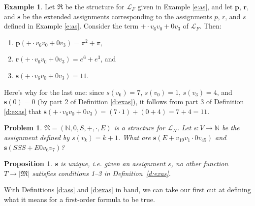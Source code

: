 \documentclass[12pt]{amsbook}
\theoremstyle{plain}
\newtheorem{prop}[thm]{Proposition}
\newtheorem{prob}[thm]{Problem}
\theoremstyle{definition}
\newtheorem{exmp}{Example}[chapter]
\theoremstyle{remark}
\begin{document}
\begin{exmp} \label{e:exas}
Let $\mathfrak{R}$ be the structure for $\mathcal{L}_F$ given in Example \ref{e:as},  and let $\mathbf{p}$,  $\mathbf{r}$,  and $\mathbf{s}$ be the extended assignments corresponding to the assignments $p$,  $r$,  and $s$ defined in Example \ref{e:as}.  Consider the term $+ \cdot v_6 v_0 + 0 v_3$ of $\mathcal{L}_F$.  Then:
\begin{enumerate}
\item $\mathbf{p}(+ \cdot v_6 v_0 + 0 v_3) = \pi^2 + \pi$,
\item $\mathbf{r}(+ \cdot v_6 v_0 + 0 v_3) = e^6 + e^3$,  and
\item $\mathbf{s}(+ \cdot v_6 v_0 + 0 v_3) = 11$.
\end{enumerate}
Here's why for the last one:  since $s(v_6) = 7$,  $s(v_0) = 1$,  $s(v_3) = 4$,  and $\mathbf{s}(0) = 0$ (by part 2 of Definition \ref{d:exas}),  it follows from part 3 of Definition \ref{d:exas} that $\mathbf{s}(+ \cdot v_6 v_0 + 0 v_3) = (7 \cdot 1) + (0 + 4) = 7 + 4 = 11$.
\end{exmp}

\begin{prob} \label{pb:exas}
$\mathfrak{N} = (\mathbb{N}, 0, S, +, \cdot, E)$ is a structure for $\mathcal{L}_N$.  Let $s \colon V \to \mathbb{N}$ be the assignment defined by $s(v_k) = k + 1$.  What are $\mathbf{s}( E + v_{19} v_1 \cdot 0 v_{45})$ and $\mathbf{s}(SSS + E 0 v_6 v_7 )$?
\end{prob}

\begin{prop} \label{p:eau}
$\mathbf s$ is unique,  {\em i.e.\/} given an assignment $s$,  no other function $T \to |\mathfrak{M}|$ satisfies conditions 1--3 in Definition~\ref{d:exas}.
\end{prop}

With Definitions \ref{d:ass} and \ref{d:exas} in hand,  we can take our first cut at defining what it means for a first-order formula to be true. 
\end{document}
